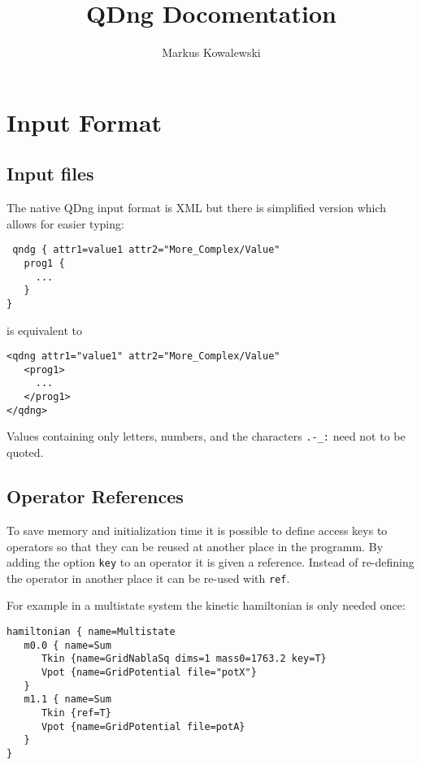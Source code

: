\documentclass[a4paper,12pt]{scrbook}
\title{QDng Docomentation}
\author{Markus Kowalewski}
\begin{document}
\maketitle

\tableofcontents

\chapter{Input Format}
\section{Input files}
The native QDng input format is XML but there is simplified version which allows
for easier typing:
\begin{verbatim}
 qndg { attr1=value1 attr2="More_Complex/Value"
   prog1 {
     ...
   }
}
\end{verbatim}
is equivalent to 
\begin{verbatim}
<qdng attr1="value1" attr2="More_Complex/Value"
   <prog1>
     ...
   </prog1>
</qdng>
\end{verbatim}
Values containing only letters, numbers, and the characters \verb|.-_:| need not to
be quoted.

\section{Operator References}
To save memory and initialization time it is possible to define access keys to operators
so that they can be reused at another place in the programm. By adding the option \verb|key|
to an operator it is given a reference. Instead of re-defining the operator in another place
it can be re-used with \verb|ref|.

For example in a multistate system the kinetic hamiltonian
is only needed once:
\begin{verbatim}
hamiltonian { name=Multistate
   m0.0 { name=Sum
      Tkin {name=GridNablaSq dims=1 mass0=1763.2 key=T}
      Vpot {name=GridPotential file="potX"}
   }
   m1.1 { name=Sum
      Tkin {ref=T}
      Vpot {name=GridPotential file=potA}
   }
} 
\end{verbatim}
\end{document}
